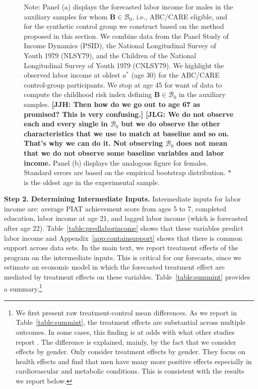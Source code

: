 \begin{figure}
Note: Panel (a) displays the forecasted labor income for males in the auxiliary samples for whom $\bm{B} \in \mathcal{B}_0$, i.e., ABC/CARE eligible, and for the synthetic control group we construct based on the method proposed in this section. We combine data from the Panel Study of Income Dynamics (PSID), the National Longitudinal Survey of Youth 1979 (NLSY79), and the Children of the National Longitudinal Survey of Youth 1979 (CNLSY79). We highlight the observed labor income at oldest $a^*$ (age 30) for the ABC/CARE control-group participants. We stop at age 45 for want of data to compute the childhood risk index defining $\bm{B} \in \mathcal{B}_0$ in the auxiliary samples. \textbf{[JJH: Then how do we go out to age 67 as promised? This is very confusing.] [JLG: We do not observe each and every single in $\mathcal{B}_0$ but we do observe the other characteristics that we use to match at baseline and so on. That's why we can do it. Not observing $\mathcal{B}_0$ does not mean that we do not observe some baseline variables and labor income.} Panel (b) displays the analogous figure for females. Standard errors are based on the empirical bootstrap distribution. $*$ is the oldest age in the experimental sample. 
\end{figure}

\noindent \textbf{Step 2. Determining Intermediate Inputs.} Intermediate inputs for labor income are: average PIAT achievement score from ages 5 to 7, completed education, labor income at age 21, and lagged labor income (which is forecasted after age 22). Table~\ref{table:predlaborincome} shows that these variables predict labor income and Appendix~\ref{app:containsupport} shows that there is common support across data sets. In the main text, we report treatment effects of the program on the intermediate inputs. This is critical for our forecasts, since we estimate an economic model in which the forecasted treatment effect are mediated by treatment effects on these variables. Table~\ref{table:summint} provides a summary.\footnote{We first present raw treatment-control mean differences. As we report in Table~\ref{table:summint}, the treatment effects are substantial across multiple outcomes. In some cases, this finding is at odds with what other studies report \citet{Ramey_etal_1985_Project-CARE_TiECSE,Clarke_Campbell_1998_ABC_Comparison_ECRQ,Campbell_Pungello_etal_2001_DP,Campbell_Ramey_etal_2002_ADS,Campbell_Wasik_etal_2008_ECRQ,Campbell_Conti_etal_2014_EarlyChildhoodInvestments}. The difference is explained, mainly, by the fact that we consider effects by gender.  Only \citet{Campbell_Conti_etal_2014_EarlyChildhoodInvestments} consider treatment effects by gender. They focus on health effects and find that men have many more positive effects especially in cardiovascular and metabolic conditions. This is consistent with the results we report below.}

